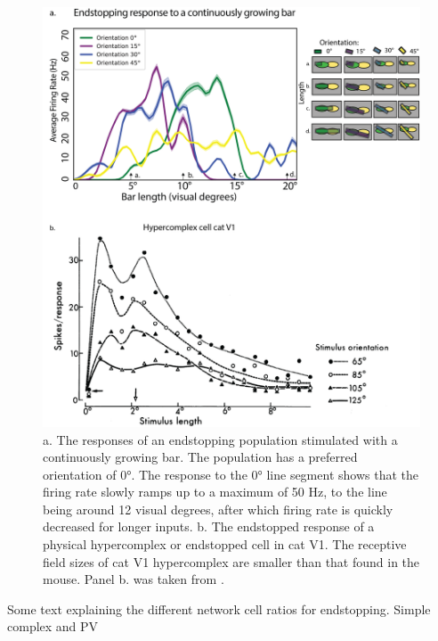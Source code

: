 \documentclass[12pt]{article}
\begin{document}
  \begin{figure}[H]
    \centering
    \includegraphics[width=1.0 \textwidth]{adjusted_figures/endstop_line_length_physiology.png}
    \caption{a. The responses of an endstopping population stimulated with a continuously growing bar. The population has a preferred orientation of 0°. The response to the 0° line segment shows that the firing rate slowly ramps up to a maximum of 50 Hz, to the line being around 12 visual degrees, after which firing rate is quickly decreased for longer inputs. b. The endstopped response of a physical hypercomplex or endstopped cell in cat V1. The receptive field sizes of cat V1 hypercomplex are smaller than that found in the mouse. Panel b. was taken from \textcite{orbanDimensionsPropertiesEndzone1979}.}
    \label{fig:endstopping_length}
  \end{figure}

Some text explaining the different network cell ratios for endstopping. Simple complex and PV
\end{document}
